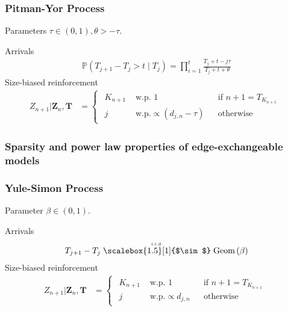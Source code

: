 \documentclass[final,hyperref={pdfpagelabels=false},noamsthm]{beamer}
\def\bbP{\mathbb{P}}
\newcommand{\ee}{Z} %
\newcommand{\bfee}{\mathbf{\ee}}
\newcommand{\bfT}{\mathbf{T}}
\newcommand{\simiid}{\overset{\scriptscriptstyle{\text{i.i.d.}}}{\widesim}}
\newcommand{\widesim}[1][1.5]{
	\mathrel{\scalebox{#1}[1]{$\sim$}}
}
\begin{document}
\begin{frame}
	\frametitle{Pitman-Yor Process}
	Parameters $\tau \in (0, 1), \theta > -\tau$.
	\vspace{15pt}
	
	Arrivals
	\begin{align}
		\bbP(T_{j+1} - T_j > t \mid T_j) = \prod_{i=1}^{t} \frac{T_j + t - j \tau}{T_j + t + \theta}
	\end{align}
	Size-biased reinforcement
	\begin{align} 
	\ee_{n+1} | \bfee_{n}, \bfT &= \begin{cases}\begin{aligned}
	K_{n+1} & \text{ w.p. } 1 && \text{if } n+1 = T_{K_{n+1}} \\
	j &\text{ w.p.} \propto (d_{j,n} - \tau) && \text{otherwise} 
	\end{aligned}\end{cases}
	\label{eq:pyp}
	\end{align}
\end{frame}

\begin{frame}
	\frametitle{Sparsity and power law properties of edge-exchangeable models}
	
\end{frame}


\begin{frame}
	\frametitle{Yule-Simon Process}
	Parameter $\beta \in (0, 1)$.
	\vspace{15pt}
	
	Arrivals
	\begin{align}
	T_{j+1} - T_{j} \simiid \text{Geom}\left( \beta \right)
	\end{align}
	Size-biased reinforcement
	\begin{align} 
	\ee_{n+1} | \bfee_{n}, \bfT &= \begin{cases}\begin{aligned}
	K_{n+1} & \text{ w.p. } 1 && \text{if } n+1 = T_{K_{n+1}} \\
	j &\text{ w.p.} \propto d_{j,n} && \text{otherwise} 
	\end{aligned}\end{cases}
	\label{eq:ys}
	\end{align}
\end{frame}
\end{document}
